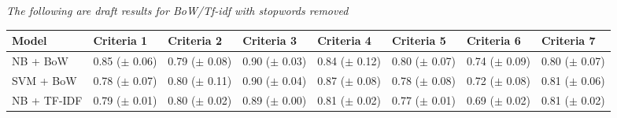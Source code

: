 \documentclass[a4paper,twoside,phd]{BYUPhys}
\begin{document}
\textit{The following are draft results for BoW/Tf-idf with stopwords removed}

\begin{table}[H]
	\centering
	\begin{tabular}{|p{1.7cm}|p{1.6cm}|p{1.6cm}|p{1.6cm}|p{1.6cm}|p{1.6cm}|p{1.6cm}|p{1.6cm}|}
		\hline
		Model & Criteria 1                                                                           & Criteria 2    & Criteria 3 & Criteria 4 & Criteria 5 & Criteria 6 & Criteria 7                                                                                                                                                                                                                                                                                                                                                          \\
		\hline
		NB + BoW  & 0.85 \newline ($\pm$ 0.06) &  0.79 \newline ($\pm$ 0.08)  & 0.90 \newline ($\pm$ 0.03)  &  0.84 \newline ($\pm$ 0.12)  &  0.80 \newline ($\pm$ 0.07)   &  0.74 \newline ($\pm$ 0.09)   &  0.80 \newline ($\pm$ 0.07)    \\
		\hline
		
		SVM + BoW  &  0.78 \newline ($\pm$ 0.07)  &  0.80 \newline ($\pm$ 0.11)  & 0.90 \newline ($\pm$ 0.04)  &  0.87 \newline ($\pm$ 0.08)  & 0.78 \newline ($\pm$ 0.08)   &  0.72 \newline ($\pm$ 0.08)   &  0.81 \newline ($\pm$ 0.06)  \\
		\hline                                                                                                                                                                                                                
				
		NB + TF-IDF  &  0.79 \newline ($\pm$ 0.01)  & 0.80 \newline ($\pm$ 0.02)  &  0.89 \newline ($\pm$ 0.00)  &  0.81 \newline ($\pm$ 0.02)  & 0.77 \newline ($\pm$ 0.01)   & 0.69 \newline ($\pm$ 0.02)   &  0.81 \newline ($\pm$ 0.02)   \\
		\hline
		

\end{tabular}
\end{table}
\end{document}
